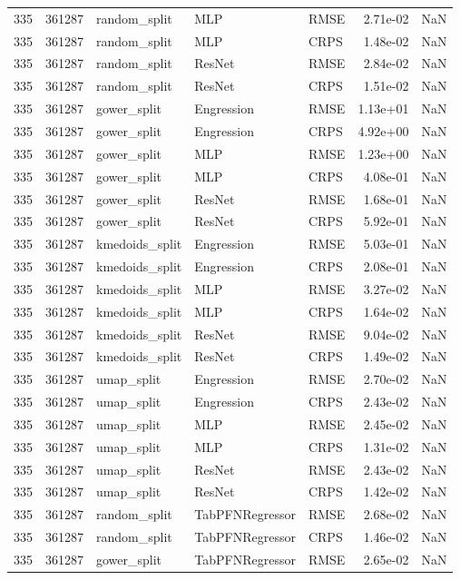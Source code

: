 \begin{tabular}{rrlllrr}
335 & 361287 & random\_split & MLP & RMSE & 2.71e-02 & NaN \\
335 & 361287 & random\_split & MLP & CRPS & 1.48e-02 & NaN \\
335 & 361287 & random\_split & ResNet & RMSE & 2.84e-02 & NaN \\
335 & 361287 & random\_split & ResNet & CRPS & 1.51e-02 & NaN \\
335 & 361287 & gower\_split & Engression & RMSE & 1.13e+01 & NaN \\
335 & 361287 & gower\_split & Engression & CRPS & 4.92e+00 & NaN \\
335 & 361287 & gower\_split & MLP & RMSE & 1.23e+00 & NaN \\
335 & 361287 & gower\_split & MLP & CRPS & 4.08e-01 & NaN \\
335 & 361287 & gower\_split & ResNet & RMSE & 1.68e-01 & NaN \\
335 & 361287 & gower\_split & ResNet & CRPS & 5.92e-01 & NaN \\
335 & 361287 & kmedoids\_split & Engression & RMSE & 5.03e-01 & NaN \\
335 & 361287 & kmedoids\_split & Engression & CRPS & 2.08e-01 & NaN \\
335 & 361287 & kmedoids\_split & MLP & RMSE & 3.27e-02 & NaN \\
335 & 361287 & kmedoids\_split & MLP & CRPS & 1.64e-02 & NaN \\
335 & 361287 & kmedoids\_split & ResNet & RMSE & 9.04e-02 & NaN \\
335 & 361287 & kmedoids\_split & ResNet & CRPS & 1.49e-02 & NaN \\
335 & 361287 & umap\_split & Engression & RMSE & 2.70e-02 & NaN \\
335 & 361287 & umap\_split & Engression & CRPS & 2.43e-02 & NaN \\
335 & 361287 & umap\_split & MLP & RMSE & 2.45e-02 & NaN \\
335 & 361287 & umap\_split & MLP & CRPS & 1.31e-02 & NaN \\
335 & 361287 & umap\_split & ResNet & RMSE & 2.43e-02 & NaN \\
335 & 361287 & umap\_split & ResNet & CRPS & 1.42e-02 & NaN \\
335 & 361287 & random\_split & TabPFNRegressor & RMSE & 2.68e-02 & NaN \\
335 & 361287 & random\_split & TabPFNRegressor & CRPS & 1.46e-02 & NaN \\
335 & 361287 & gower\_split & TabPFNRegressor & RMSE & 2.65e-02 & NaN \\

\end{tabular}
